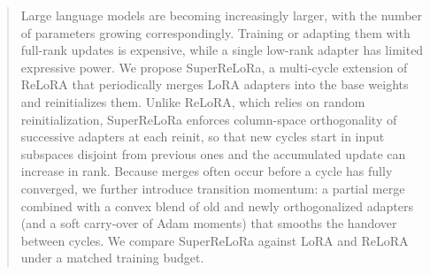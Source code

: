 \begin{abstract}
Large language models are becoming increasingly larger, with the number of parameters growing correspondingly.
Training or adapting them with full-rank updates is expensive, while a single low-rank adapter has limited expressive power.
We propose SuperReLoRa, a multi-cycle extension of ReLoRA that periodically merges LoRA adapters into the base weights and reinitializes them.
Unlike ReLoRA, which relies on random reinitialization, SuperReLoRa enforces column-space orthogonality of successive adapters at each reinit, so that new cycles start in input subspaces disjoint from previous ones and the accumulated update can increase in rank.
Because merges often occur before a cycle has fully converged, we further introduce transition momentum: a partial merge combined with a convex blend of old and newly orthogonalized adapters (and a soft carry-over of Adam moments) that smooths the handover between cycles.
We compare SuperReLoRa against LoRA and ReLoRA under a matched training budget.
\end{abstract}
